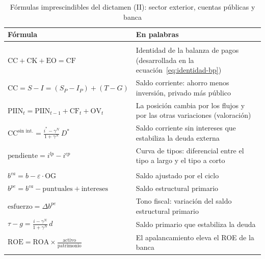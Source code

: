 \documentclass[11pt]{article}
\begin{document}
\begin{table}[H]
\centering\small
\renewcommand{\arraystretch}{1.22}
\caption{Fórmulas imprescindibles del dictamen (II): sector exterior, cuentas públicas y banca}\label{tab:formulas-2}
\begin{tabular}{>{\centering\arraybackslash}m{7.4cm}>{\raggedright\arraybackslash}m{7.6cm}}
\toprule
\rowcolor{tceeazulpalido}
\textbf{Fórmula} & \textbf{En palabras} \\
\midrule
\rowcolor{tceesalvia}\multicolumn{2}{l}{\emph{Sector exterior}} \\
$\displaystyle \mathrm{CC}+\mathrm{CK}+\mathrm{EO}=\mathrm{CF}$ & Identidad de la balanza de pagos (desarrollada en la ecuación~\eqref{eq:identidad-bp}) \\
$\displaystyle \mathrm{CC}=S-I=(S_P-I_P)+(T-G)$ & Saldo corriente: ahorro menos inversión, privado más público \\
$\displaystyle \mathrm{PIIN}_t=\mathrm{PIIN}_{t-1}+\mathrm{CF}_t+\mathrm{OV}_t$ & La posición cambia por los flujos y por las otras variaciones (valoración) \\
$\displaystyle \mathrm{CC}^{\text{sin int.}}=\frac{i^*-\gamma^N}{1+\gamma^N}\,D^*$ & Saldo corriente sin intereses que estabiliza la deuda externa \\
$\displaystyle \text{pendiente}=i^{lp}-i^{cp}$ & Curva de tipos: diferencial entre el tipo a largo y el tipo a corto \\
\rowcolor{tceesalvia}\multicolumn{2}{l}{\emph{Cuentas públicas y banca}} \\
$\displaystyle b^{ca}=b-\varepsilon\cdot\mathrm{OG}$ & Saldo ajustado por el ciclo \\
$\displaystyle b^{pe}=b^{ca}-\text{puntuales}+\text{intereses}$ & Saldo estructural primario \\
$\displaystyle \text{esfuerzo}=\Delta b^{pe}$ & Tono fiscal: variación del saldo estructural primario \\
$\displaystyle \tau-g=\frac{i-\gamma^N}{1+\gamma^N}\,d$ & Saldo primario que estabiliza la deuda \\
$\displaystyle \mathrm{ROE}=\mathrm{ROA}\times\frac{\text{activo}}{\text{patrimonio}}$ & El apalancamiento eleva el ROE de la banca \\
\bottomrule
\end{tabular}
\end{table}
\end{document}
